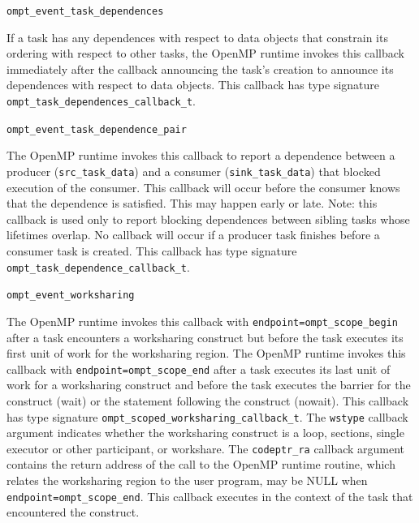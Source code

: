 \documentclass{article}
\newcommand{\descheader}[1]{{\needspace{3\baselineskip}\vspace{1em}\noindent \fbox{#1}}}
\begin{document}
\begin{description}
\sloppy


\item \verb|ompt_event_task_dependences|

  If a task has any dependences with respect to data objects that constrain its ordering with respect to other tasks, 
  the OpenMP runtime invokes this callback immediately after the callback announcing the task's creation to announce its dependences with respect to data objects. 
  This callback has type signature \verb|ompt_task_dependences_callback_t|.
  
\item \verb|ompt_event_task_dependence_pair|

The OpenMP runtime invokes this callback to report a dependence between a producer (\verb|src_task_data|) 
and a consumer (\verb|sink_task_data|) that blocked execution of the consumer.
This callback will occur before the consumer knows that the dependence is satisfied. This may happen early or late.
Note: this callback is used only to report blocking dependences between sibling tasks whose lifetimes overlap. 
No callback will occur if a producer task finishes before a consumer task is created.
This callback has type signature \verb|ompt_task_dependence_callback_t|. 
\end{description}


\descheader{Worksharing}

\begin{description}

\item \verb|ompt_event_worksharing|

\sloppy
The OpenMP runtime invokes this callback with \verb|endpoint=ompt_scope_begin| after a task encounters a worksharing 
construct but before the task executes its first unit of work for the worksharing region. 
The OpenMP runtime invokes this callback with \verb|endpoint=ompt_scope_end| after a task executes 
its last unit of work for a worksharing construct and before the task executes the barrier  for the construct (wait) or the statement following the construct (nowait).
This callback has type signature \verb|ompt_scoped_worksharing_callback_t|.
The \verb|wstype| callback argument indicates whether the worksharing construct is a loop, sections, single executor or other participant, 
or workshare.
The \verb|codeptr_ra| callback argument contains the return address of the call to the OpenMP runtime routine, which relates the worksharing region to the user program,
may be NULL when \verb|endpoint=|\verb|ompt_scope_end|.
This callback executes in the context of the task that encountered the construct. 

\end{description}
\end{document}
